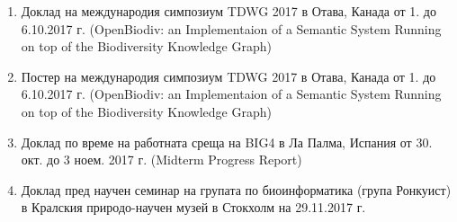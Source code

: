 \begin{enumerate}
    \item Доклад на международия симпозиум TDWG 2017 в Отава, Канада от 1. до 6.10.2017 г. (OpenBiodiv: an Implementaion of a Semantic System Running on top of the Biodiversity Knowledge Graph)
    \item Постер на международия симпозиум TDWG 2017 в Отава, Канада от 1. до 6.10.2017 г. (OpenBiodiv: an Implementaion of a Semantic System Running on top of the Biodiversity Knowledge Graph)
    \item Доклад по време на работната среща на BIG4 в Ла Палма, Испания от 30. окт. до 3 ноем. 2017 г. (Midterm Progress Report)
    \item Доклад пред научен семинар на групата по биоинформатика (група Ронкуист) в Кралския природо-научен музей в Стокхолм на 29.11.2017 г.
\end{enumerate}





